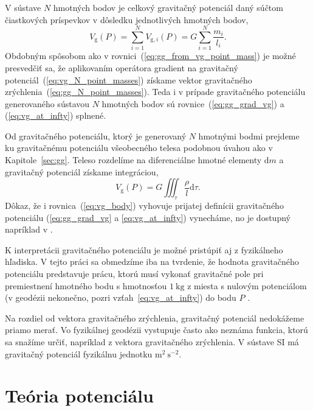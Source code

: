 \documentclass[a4paper, 12pt]{book}
\newcommand{\diff}{\mathrm d}
\newcommand{\gidx}{\mathrm g}
\begin{document}
V sústave $N$ hmotných bodov je celkový gravitačný potenciál daný súčtom 
čiastkových príspevkov v dôsledku jednotlivých hmotných bodov,
%
\begin{equation}
\label{eq:vg_N_point_masses}
V_\gidx(P) = \sum_{i = 1}^{N} V_{\gidx,i}(P) = G \sum_{i = 1}^{N}\frac{
m_i}{l_i}{.}
\end{equation}
%
Obdobným spôsobom ako v rovnici~(\ref{eq:gg_from_vg_point_mass}) je možné 
presvedčiť sa, že aplikovaním operátora gradient na gravitačný 
potenciál~(\ref{eq:vg_N_point_masses}) získame vektor gravitačného 
zrýchlenia~(\ref{eq:gg_N_point_masses}).  Teda i v prípade gravitačného 
potenciálu generovaného sústavou $N$ hmotných bodov sú 
rovnice~(\ref{eq:gg_grad_vg}) a (\ref{eq:vg_at_infty}) splnené.

Od gravitačného potenciálu, ktorý je generovaný $N$ hmotnými bodmi prejdeme ku 
gravitačnému potenciálu všeobecného telesa podobnou úvahou ako 
v Kapitole~\ref{sec:gg}.  Teleso rozdelíme na diferenciálne hmotné elementy 
$\diff m$ a gravitačný potenciál získame integráciou,
%
\begin{equation}
\label{eq:vg_body}
V_\gidx(P) = G \iiint_{\tau} \frac{\rho}{l} \diff\tau{.}
\end{equation}
%
Dôkaz, že i rovnica~(\ref{eq:vg_body}) vyhovuje prijatej definícii gravitačného 
potenciálu (\ref{eq:gg_grad_vg} a \ref{eq:vg_at_infty}) vynecháme, no je 
dostupný napríklad v \cite{MacMillan1930}.

K interpretácii gravitačného potenciálu je možné pristúpiť aj z fyzikálneho 
hľadiska.  V tejto práci sa obmedzíme iba na tvrdenie, že hodnota gravitačného 
potenciálu predstavuje prácu, ktorú musí vykonať gravitačné pole pri 
premiestnení hmotného bodu s hmotnosťou $1\ \mathrm{kg}$ z miesta s nulovým 
potenciálom (v geodézii nekonečno, pozri vzťah~\ref{eq:vg_at_infty}) do bodu $P$ 
\citep{MacMillan1930,Kellogg1967,TorgeGeodesy}.

Na rozdiel od vektora gravitačného zrýchlenia, gravitačný potenciál nedokážeme 
priamo merať.  Vo fyzikálnej geodézii vystupuje často ako neznáma funkcia, 
ktorú sa snažíme určiť, napríklad z vektora gravitačného zrýchlenia.  V sústave 
SI má gravitačný potenciál fyzikálnu jednotku $\mathrm{m}^2\ \mathrm{s}^{-2}$.






\section{Teória potenciálu}
\end{document}
